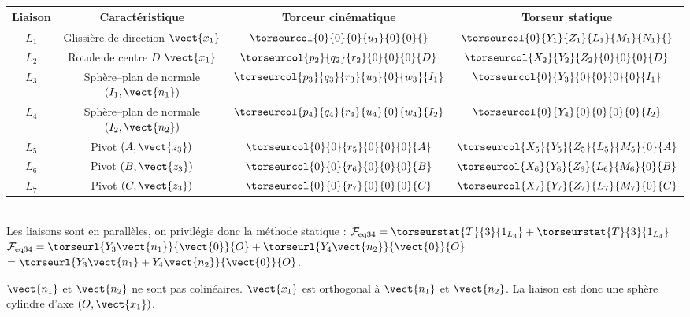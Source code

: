 \ifprof
\begin{corrige}~\\
\begin{center}
\begin{tabular}{|c|c|c|c|}
\hline
Liaison & Caractéristique & Torceur cinématique & Torseur statique \\
\hline\hline
$L_1 $ & Glissière de direction $\vect{x_1}$ & 
$\torseurcol{0}{0}{0}{u_1}{0}{0}{}$ & 
$\torseurcol{0}{Y_1}{Z_1}{L_1}{M_1}{N_1}{}$ \\ \hline
$L_2 $ & Rotule de centre $D$ $\vect{x_1}$ & 
$\torseurcol{p_2}{q_2}{r_2}{0}{0}{0}{D}$ & 
$\torseurcol{X_2}{Y_2}{Z_2}{0}{0}{0}{D}$ \\ \hline
$L_3 $ & Sphère--plan de normale $\left(I_1,\vect{n_1}\right)$ & 
$\torseurcol{p_3}{q_3}{r_3}{u_3}{0}{w_3}{I_1}$ & 
$\torseurcol{0}{Y_3}{0}{0}{0}{0}{I_1}$ \\ \hline
$L_4 $ & Sphère--plan de normale $\left(I_2,\vect{n_2}\right)$ & 
$\torseurcol{p_4}{q_4}{r_4}{u_4}{0}{w_4}{I_2}$ & 
$\torseurcol{0}{Y_4}{0}{0}{0}{0}{I_2}$ \\ \hline
$L_5 $ & Pivot $\left(A,\vect{z_3}\right)$ & 
$\torseurcol{0}{0}{r_5}{0}{0}{0}{A}$ & 
$\torseurcol{X_5}{Y_5}{Z_5}{L_5}{M_5}{0}{A}$ \\ \hline
$L_6 $ & Pivot $\left(B,\vect{z_3}\right)$ & 
$\torseurcol{0}{0}{r_6}{0}{0}{0}{B}$ & 
$\torseurcol{X_6}{Y_6}{Z_6}{L_6}{M_6}{0}{B}$ \\ \hline
$L_7 $ & Pivot $\left(C,\vect{z_3}\right)$ & 
$\torseurcol{0}{0}{r_7}{0}{0}{0}{C}$ & 
$\torseurcol{X_7}{Y_7}{Z_7}{L_7}{M_7}{0}{C}$ \\ \hline
\end{tabular}
\end{center}
\end{corrige}
\else
\fi




\ifprof
\begin{corrige}~\\
Les liaisons sont en parallèles, on privilégie donc la méthode statique : 
$\mathcal{F}_{\text{eq}34} =\torseurstat{T}{3}{1_{L_3}}+\torseurstat{T}{3}{1_{L_4}}$ 
$\mathcal{F}_{\text{eq}34} =\torseurl{Y_3\vect{n_1}}{\vect{0}}{O}+ \torseurl{Y_4\vect{n_2}}{\vect{0}}{O}$
$=\torseurl{Y_3\vect{n_1}+Y_4\vect{n_2}}{\vect{0}}{O}$. 

$\vect{n_1}$ et $\vect{n_2}$ ne sont pas colinéaires. $\vect{x_1}$ est orthogonal à $\vect{n_1}$  et $\vect{n_2}$. La liaison est donc une sphère cylindre d'axe $\left(O,\vect{x_1}\right)$.  
\end{corrige}
\else
\fi


